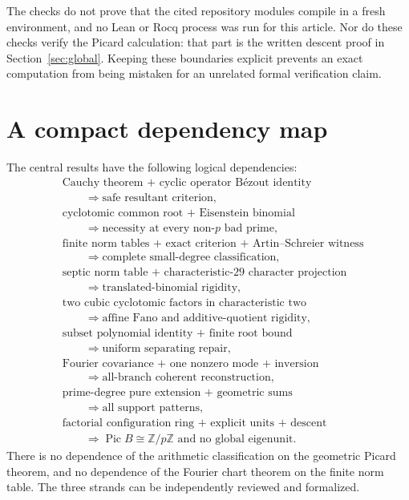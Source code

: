 \documentclass[11pt,a4paper]{article}
\theoremstyle{definition}
\theoremstyle{remark}
\newcommand{\Z}{\mathbb Z}
\newcommand{\Pic}{\operatorname{Pic}}
\begin{document}
The checks do not prove that the cited repository modules compile in a
fresh environment, and no Lean or Rocq process was run for this article.
Nor do these checks verify the Picard calculation: that part is the written
descent proof in Section~\ref{sec:global}. Keeping these boundaries explicit
prevents an exact computation from being mistaken for an unrelated formal
verification claim.

\section{A compact dependency map}

The central results have the following logical dependencies:
\begin{align*}
 &\text{Cauchy theorem + cyclic operator B\'ezout identity}\\
 &\hspace{2em}\Longrightarrow\text{safe resultant criterion},\\[3pt]
 &\text{cyclotomic common root + Eisenstein binomial}\\
 &\hspace{2em}\Longrightarrow\text{necessity at every non-$p$ bad prime},\\[3pt]
 &\text{finite norm tables + exact criterion + Artin--Schreier witness}\\
 &\hspace{2em}\Longrightarrow\text{complete small-degree classification},\\[3pt]
 &\text{septic norm table + characteristic-$29$ character projection}\\
 &\hspace{2em}\Longrightarrow\text{translated-binomial rigidity},\\[3pt]
 &\text{two cubic cyclotomic factors in characteristic two}\\
 &\hspace{2em}\Longrightarrow\text{affine Fano and additive-quotient rigidity},\\[3pt]
 &\text{subset polynomial identity + finite root bound}\\
 &\hspace{2em}\Longrightarrow\text{uniform separating repair},\\[3pt]
 &\text{Fourier covariance + one nonzero mode + inversion}\\
 &\hspace{2em}\Longrightarrow\text{all-branch coherent reconstruction},\\[3pt]
 &\text{prime-degree pure extension + geometric sums}\\
 &\hspace{2em}\Longrightarrow\text{all support patterns},\\[3pt]
 &\text{factorial configuration ring + explicit units + descent}\\
 &\hspace{2em}\Longrightarrow\Pic B\cong\Z/p\Z\text{ and no global eigenunit}.
\end{align*}
There is no dependence of the arithmetic classification on the geometric
Picard theorem, and no dependence of the Fourier chart theorem on the
finite norm table. The three strands can be independently reviewed and
formalized.
\end{document}

